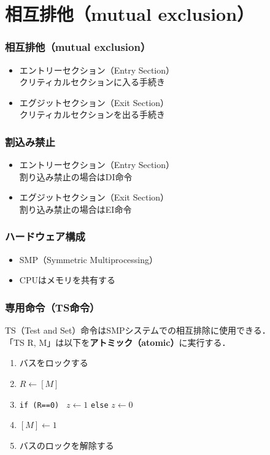 \documentclass[dvipdfmx]{beamer}
\begin{document}
\section{相互排他（mutual exclusion）}
\begin{frame}
  \frametitle{相互排他（mutual exclusion）}
  \begin{itemize}
  \item エントリーセクション（Entry Section）\\
    クリティカルセクションに入る手続き
  \item エグジットセクション（Exit Section）\\
    クリティカルセクションを出る手続き
  \end{itemize}
\end{frame}

\begin{frame}
  \frametitle{割込み禁止}
  
  \begin{itemize}
  \item エントリーセクション（Entry Section）\\
    割り込み禁止の場合はDI命令
  \item エグジットセクション（Exit Section）\\
    割り込み禁止の場合はEI命令
  \end{itemize}
\end{frame}

\begin{frame}
  \frametitle{ハードウェア構成}
  \begin{itemize}
    \item SMP（Symmetric Multiprocessing）
    \item CPUはメモリを共有する
  \end{itemize}
\end{frame}

\begin{frame}
  \frametitle{専用命令（TS命令）}
  TS（Test and Set）命令はSMPシステムでの相互排除に使用できる．\\
  「TS  R, M」は以下を{\bf アトミック（atomic）}に実行する．
  \begin{enumerate}
  \item バスをロックする
  \item $R \leftarrow [M]$
  \item {\tt if (R==0) } $z \leftarrow 1$ {\tt else} $z \leftarrow 0$
  \item $[M] \leftarrow 1$
  \item バスのロックを解除する
  \end{enumerate}
\end{frame}
\end{document}
